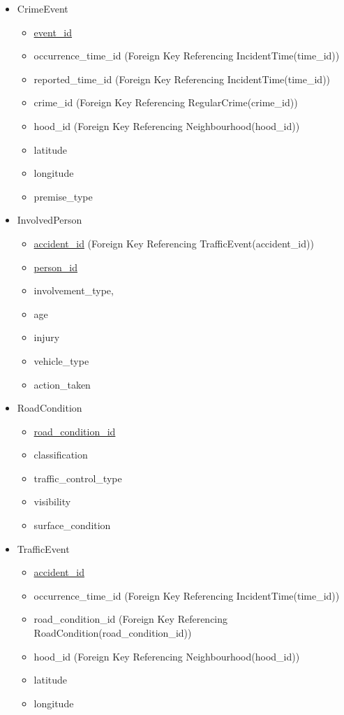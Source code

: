 \documentclass[12pt, a4paper]{article}
\begin{document}
\begin{itemize}
\begin{itemize}
    \end{itemize}
    \item CrimeEvent
        \begin{itemize}
        \item \underline{event\_id}
        \item occurrence\_time\_id (Foreign Key Referencing IncidentTime(time\_id))
        \item reported\_time\_id (Foreign Key Referencing IncidentTime(time\_id))
        \item crime\_id (Foreign Key Referencing RegularCrime(crime\_id))
        \item hood\_id (Foreign Key Referencing Neighbourhood(hood\_id))
        \item latitude
        \item longitude
        \item premise\_type
    \end{itemize}
    \item InvolvedPerson
    \begin{itemize}
        \item \underline{accident\_id} (Foreign Key Referencing TrafficEvent(accident\_id))
        \item \underline{person\_id}
        \item involvement\_type,
        \item age
        \item injury
        \item vehicle\_type
        \item action\_taken
    \end{itemize}
    \item RoadCondition
    \begin{itemize}
        \item \underline{road\_condition\_id}
        \item classification
        \item traffic\_control\_type
        \item visibility
        \item surface\_condition
    \end{itemize}
    \item TrafficEvent
    \begin{itemize}
        \item \underline{accident\_id}
        \item occurrence\_time\_id (Foreign Key Referencing IncidentTime(time\_id))
        \item road\_condition\_id (Foreign Key Referencing RoadCondition(road\_condition\_id))
        \item hood\_id (Foreign Key Referencing Neighbourhood(hood\_id))
        \item latitude
        \item longitude
    \end{itemize}
\end{itemize}
\end{document}
